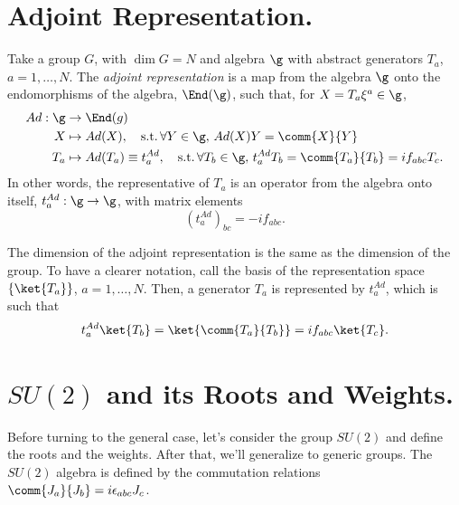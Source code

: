 \section{Adjoint Representation.}
Take a group $G$, with $\dim G = N$ and algebra $\g$ with abstract generators $T_a$, $a = 1, \dots, N$. The \emph{adjoint representation} is a map from the algebra $\g$ onto the endomorphisms of the algebra, $\End(\g)$, such that, for $X = T_a \xi^a \in \g$,
\begin{equation}
\begin{aligned}
    Ad: \g &\to \End(g) \\
    X &\mapsto Ad(X), \quad \textup{s.t.} \, \forall Y \in \g, \, Ad(X)Y = \comm{X}{Y} \\
    T_a &\mapsto Ad(T_a) \equiv t^{Ad}_a, \quad \textup{s.t.} \, \forall T_b \in \g, \, t^{Ad}_a T_b = \comm{T_a}{T_b} = i f_{abc} T_c .
\end{aligned}
\end{equation}
In other words, the representative of $T_a$ is an operator from the algebra onto itself, $t^{Ad}_a: \g \to \g$, with matrix elements
\begin{equation}
    (t^{Ad}_a)_{bc} = -i f_{abc} .
\end{equation}

The dimension of the adjoint representation is the same as the dimension of the group. To have a clearer notation, call the basis of the representation space $\{ \ket{T_a} \}$, $a = 1, \dots, N$. Then, a generator $T_a$ is represented by $t^{Ad}_a$, which is such that
\begin{equation}\label{appeq:adjoint-def}
    t^{Ad}_a \ket{T_b} = \ket{\comm{T_a}{T_b}} = i f_{abc} \ket{T_c}.
\end{equation}


\section{\texorpdfstring{$SU(2)$}{SU(2)} and its Roots and Weights.}
Before turning to the general case, let's consider the group $SU(2)$ and define the roots and the weights. After that, we'll generalize to generic groups. The $SU(2)$ algebra is defined by the commutation relations $\comm{J_a}{J_b} = i \epsilon_{abc} J_c$. 

